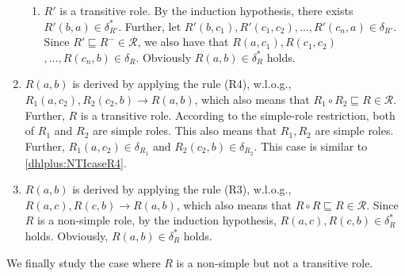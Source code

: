 \begin{enumerate}[leftmargin=12ex,label=Case~2.\arabic*, ref=Case~2.\arabic*]
\begin{enumerate}[leftmargin=8ex,label=Case~2.2.\arabic*]
     \item $R'$ is a transitive role.
        By the induction hypothesis, there exists $R'(b,a)\in\delta^*_{R'}$.
        Further, let $R'(b,c_1),R'(c_1,c_2),\ldots ,R'(c_n,a)\in\delta_{R'}$.
        Since $R'\sqsubseteq R^-\in\mathcal{R}$, we also have that
        $R(a,c_1),R(c_1,c_2)$ $,\ldots ,R(c_n,b)\in\delta_{R}$. Obviously $R(a,b)\in\delta^*_{R}$ holds.
    \end{enumerate}

\item $R(a,b)$ is derived by applying the rule (R4), w.l.o.g.,
    $R_1(a,c_2),R_2(c_2,b)\rightarrow R(a,b)$,
    which also means that $R_1\circ R_2\sqsubseteq R\in\mathcal{R}$.
    Further, $R$ is a transitive role. According to the simple-role restriction,
    both of $R_1$ and $R_2$ are simple roles.
    This also
    means that $R_1, R_2$ are simple roles. Further, $R_1(a,c_2)\in\delta_{R_1}$ and $R_2(c_2,b)\in\delta_{R_2}$.
    This case is similar to \ref{dhlplus:NTIcaseR4}.

\item $R(a,b)$ is derived by applying the rule (R3), w.l.o.g., $R(a,c),R(c,b)\rightarrow R(a,b)$,
    which also means that $R\circ R\sqsubseteq R\in\mathcal{R}$.
    Since $R$ is a non-simple role, by the induction hypothesis,
    $R(a,c),R(c,b)\in\delta^*_{R}$ holds. Obviously, $R(a,b)\in\delta^*_{R}$ holds.
\end{enumerate}

We finally study the case where $R$ is a non-simple but not a transitive role.


